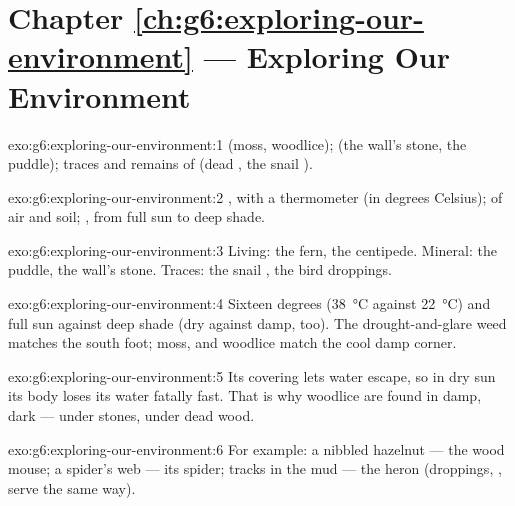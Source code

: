 \section*{Chapter \ref{ch:g6:exploring-our-environment} --- Exploring Our Environment}

\begin{solution}{exo:g6:exploring-our-environment:1}
 (moss, woodlice);  (the wall's
stone, the puddle); traces and remains of  (dead
, the snail ).
\end{solution}

\begin{solution}{exo:g6:exploring-our-environment:2}
, with a thermometer (in degrees Celsius);
 of air and soil; , from full sun to deep shade.
\end{solution}

\begin{solution}{exo:g6:exploring-our-environment:3}
Living: the fern, the centipede. Mineral: the puddle, the
wall's stone. Traces: the snail , the bird droppings.
\end{solution}

\begin{solution}{exo:g6:exploring-our-environment:4}
Sixteen degrees (\qty{38}{\degreeCelsius} against
\qty{22}{\degreeCelsius}) and full sun against deep shade
(dry against damp, too). The drought-and-glare weed matches
the south foot; moss,  and woodlice match the cool damp
corner.
\end{solution}

\begin{solution}{exo:g6:exploring-our-environment:5}
Its covering lets water escape, so in dry sun its body loses
its water fatally fast. That is why woodlice are found in
damp, dark  --- under stones, under dead wood.
\end{solution}

\begin{solution}{exo:g6:exploring-our-environment:6}
For example: a nibbled hazelnut --- the wood mouse; a
spider's web --- its spider; tracks in the mud --- the heron
(droppings, ,  serve the same way).
\end{solution}


